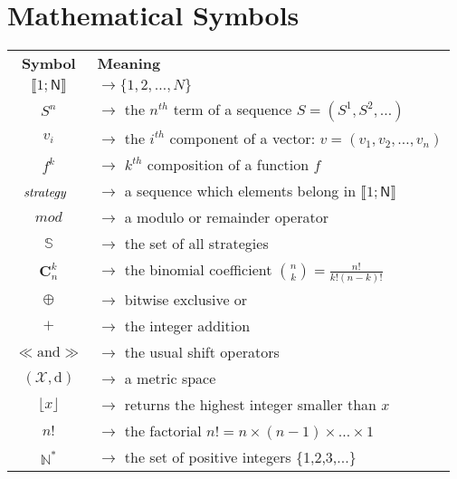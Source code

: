 \section{Mathematical Symbols}
\begin{tabular}{@{}c@{}@{}l@{}}
\textbf{Symbol} &\textbf{Meaning}\\
$\llbracket 1;\mathsf{N} \rrbracket$ & $\rightarrow\{1,2,\hdots,N\}$ \\
$S^{n}$ & $\rightarrow$ the $n^{th}$ term of a sequence $S=(S^{1},S^{2},\hdots)$ \\
$v_{i}$ & $\rightarrow$ the $i^{th}$ component of a vector: $v=(v_{1},v_{2},\hdots, v_n)$\\
$f^{k}$ & $\rightarrow$ $k^{th}$ composition of a function $f$ \\
$\emph{strategy}$~ & $\rightarrow$ a sequence which elements belong in $%
\llbracket 1;\mathsf{N} \rrbracket $ \\
$mod$ & $\rightarrow$ a modulo or remainder operator\\
$\mathbb{S}$ & $\rightarrow$ the set of all strategies \\
$\mathbf{C}_n^k$ & $\rightarrow$ the binomial coefficient ${n \choose k} = \frac{n!}{k!(n-k)!}$\\
$\oplus$ & $\rightarrow$ bitwise exclusive or \\
$+$ & $\rightarrow$ the integer addition \\
$\ll \text{and} \gg$ & $\rightarrow$ the usual shift operators \\
$(\mathcal{X}, \text{d})$ & $\rightarrow$ a metric space  \\
$\lfloor x \rfloor$ & $\rightarrow$ returns the highest integer smaller than $x$  \\
$n!$ & $\rightarrow$ the factorial $n!=n\times(n-1)\times\dots\times1$\\
$\mathds{N}^{\ast }$ & $\rightarrow$ the set of positive integers \{1,2,3,...\}
\end{tabular}

